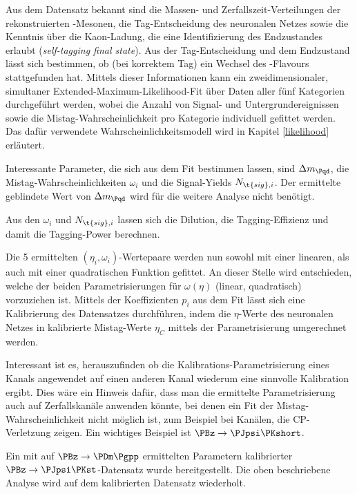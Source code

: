 Aus dem Datensatz bekannt sind die Massen- und Zerfallszeit-Verteilungen der rekonstruierten \PB-Mesonen, die Tag-Entscheidung des neuronalen Netzes sowie die Kenntnis über die Kaon-Ladung, die eine Identifizierung des Endzustandes erlaubt (\emph{self-tagging final state}).
Aus der Tag-Entscheidung und dem Endzustand lässt sich bestimmen, ob (bei korrektem Tag) ein Wechsel des \Pqb-Flavours stattgefunden hat.
Mittels dieser Informationen kann ein zweidimensionaler, simultaner Extended-Maximum-Likelihood-Fit über Daten aller fünf Kategorien durchgeführt werden, wobei die Anzahl von Signal- und Untergrundereignissen sowie die Mistag-Wahrscheinlichkeit pro Kategorie individuell gefittet werden.
Das dafür verwendete Wahrscheinlichkeitsmodell wird in Kapitel \ref{likelihood} erläutert.

Interessante Parameter, die sich aus dem Fit bestimmen lassen, sind $\difference{m_{\Pqd}}$, die Mistag-Wahrscheinlichkeiten $ω_i$ und die Signal-Yields $N_{\t{sig},i}$.
Der ermittelte geblindete Wert von $\difference{m_{\Pqd}}$ wird für die weitere Analyse nicht benötigt.

Aus den $ω_i$ und $N_{\t{sig},i}$ lassen sich die Dilution, die Tagging-Effizienz und damit die Tagging-Power berechnen.

Die 5 ermittelten $(η_i, ω_i)$-Wertepaare werden nun sowohl mit einer linearen, als auch mit einer quadratischen Funktion gefittet.
An dieser Stelle wird entschieden, welche der beiden Parametrisierungen für $ω(η)$ (linear, quadratisch) vorzuziehen ist.
Mittels der Koeffizienten $p_i$ aus dem Fit lässt sich eine Kalibrierung des Datensatzes durchführen, indem die $η$-Werte des neuronalen Netzes in kalibrierte Mistag-Werte $η_C$ mittels der Parametrisierung umgerechnet werden.

Interessant ist es, herauszufinden ob die Kalibrations-Parametrisierung eines Kanals angewendet auf einen anderen Kanal wiederum eine sinnvolle Kalibration ergibt.
Dies wäre ein Hinweis dafür, dass man die ermittelte Parametrisierung auch auf Zerfallskanäle anwenden könnte, bei denen ein Fit der Mistag-Wahrscheinlichkeit nicht möglich ist, zum Beispiel bei Kanälen, die CP-Verletzung zeigen. Ein wichtiges Beispiel ist $\PBz \to \PJpsi\PKshort$.

Ein mit auf $\PBz \to \PDm \Pgpp$ ermittelten Parametern kalibrierter $\PBz \to \PJpsi\PKst$-Datensatz wurde bereitgestellt.
Die oben beschriebene Analyse wird auf dem kalibrierten Datensatz wiederholt.

